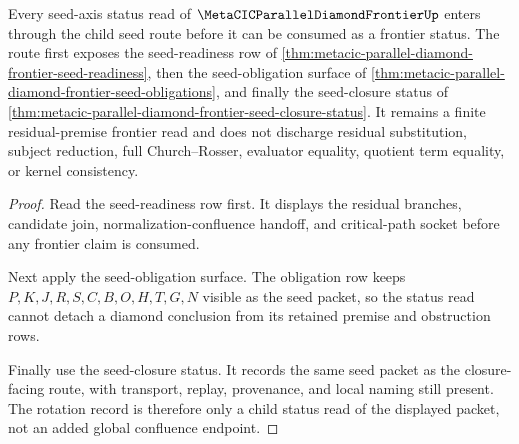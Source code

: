 \begin{theorem}
\label{thm:metacic-parallel-diamond-frontier-seed-axis-rotation-record}
Every seed-axis status read of $\MetaCICParallelDiamondFrontierUp$ enters through the child seed route before it can be consumed as a frontier status. The route first exposes the seed-readiness row of \autoref{thm:metacic-parallel-diamond-frontier-seed-readiness}, then the seed-obligation surface of \autoref{thm:metacic-parallel-diamond-frontier-seed-obligations}, and finally the seed-closure status of \autoref{thm:metacic-parallel-diamond-frontier-seed-closure-status}. It remains a finite residual-premise frontier read and does not discharge residual substitution, subject reduction, full Church--Rosser, evaluator equality, quotient term equality, or kernel consistency.
\end{theorem}
\begin{proof}
Read the seed-readiness row first. It displays the residual branches, candidate join, normalization-confluence handoff, and critical-path socket before any frontier claim is consumed.

Next apply the seed-obligation surface. The obligation row keeps $P,K,J,R,S,C,B,O,H,T,G,N$ visible as the seed packet, so the status read cannot detach a diamond conclusion from its retained premise and obstruction rows.

Finally use the seed-closure status. It records the same seed packet as the closure-facing route, with transport, replay, provenance, and local naming still present. The rotation record is therefore only a child status read of the displayed packet, not an added global confluence endpoint.
\end{proof}
